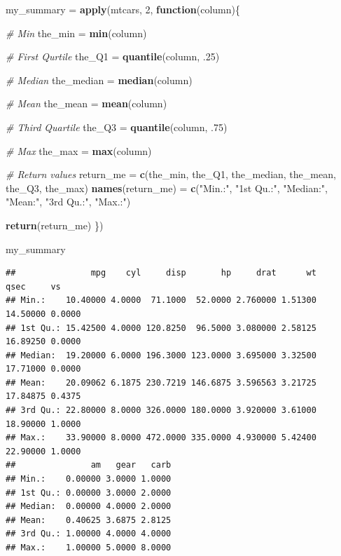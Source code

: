 \documentclass[
]{book}
\newenvironment{Shaded}{\begin{snugshade}}{\end{snugshade}}
\newcommand{\CommentTok}[1]{\textcolor[rgb]{0.56,0.35,0.01}{\textit{#1}}}
\newcommand{\ControlFlowTok}[1]{\textcolor[rgb]{0.13,0.29,0.53}{\textbf{#1}}}
\newcommand{\DecValTok}[1]{\textcolor[rgb]{0.00,0.00,0.81}{#1}}
\newcommand{\FloatTok}[1]{\textcolor[rgb]{0.00,0.00,0.81}{#1}}
\newcommand{\KeywordTok}[1]{\textcolor[rgb]{0.13,0.29,0.53}{\textbf{#1}}}
\newcommand{\NormalTok}[1]{#1}
\newcommand{\StringTok}[1]{\textcolor[rgb]{0.31,0.60,0.02}{#1}}
\begin{document}
\begin{Shaded}
\begin{Highlighting}[]
\NormalTok{my_summary =}\StringTok{ }\KeywordTok{apply}\NormalTok{(mtcars, }\DecValTok{2}\NormalTok{, }\ControlFlowTok{function}\NormalTok{(column)\{}
  
  \CommentTok{# Min}
\NormalTok{  the_min =}\StringTok{ }\KeywordTok{min}\NormalTok{(column)}
  
  \CommentTok{# First Qurtile}
\NormalTok{  the_Q1 =}\StringTok{ }\KeywordTok{quantile}\NormalTok{(column, }\FloatTok{.25}\NormalTok{)}
  
  \CommentTok{# Median}
\NormalTok{  the_median =}\StringTok{ }\KeywordTok{median}\NormalTok{(column)}
  
  \CommentTok{# Mean }
\NormalTok{  the_mean =}\StringTok{ }\KeywordTok{mean}\NormalTok{(column)}
  
  \CommentTok{# Third Quartile}
\NormalTok{  the_Q3 =}\StringTok{ }\KeywordTok{quantile}\NormalTok{(column, }\FloatTok{.75}\NormalTok{)}
  
  \CommentTok{# Max}
\NormalTok{  the_max =}\StringTok{ }\KeywordTok{max}\NormalTok{(column)}
  
  \CommentTok{# Return values}
\NormalTok{  return_me =}\StringTok{ }\KeywordTok{c}\NormalTok{(the_min, the_Q1, the_median,}
\NormalTok{                the_mean, the_Q3, the_max)}
  \KeywordTok{names}\NormalTok{(return_me) =}\StringTok{ }\KeywordTok{c}\NormalTok{(}\StringTok{"Min.:"}\NormalTok{, }\StringTok{"1st Qu.:"}\NormalTok{, }
                       \StringTok{"Median:"}\NormalTok{, }\StringTok{"Mean:"}\NormalTok{, }
                       \StringTok{"3rd Qu.:"}\NormalTok{, }\StringTok{"Max.:"}\NormalTok{)}
  
  \KeywordTok{return}\NormalTok{(return_me)}
\NormalTok{\})}

\NormalTok{my_summary}
\end{Highlighting}
\end{Shaded}

\begin{verbatim}
##               mpg    cyl     disp       hp     drat      wt     qsec     vs
## Min.:    10.40000 4.0000  71.1000  52.0000 2.760000 1.51300 14.50000 0.0000
## 1st Qu.: 15.42500 4.0000 120.8250  96.5000 3.080000 2.58125 16.89250 0.0000
## Median:  19.20000 6.0000 196.3000 123.0000 3.695000 3.32500 17.71000 0.0000
## Mean:    20.09062 6.1875 230.7219 146.6875 3.596563 3.21725 17.84875 0.4375
## 3rd Qu.: 22.80000 8.0000 326.0000 180.0000 3.920000 3.61000 18.90000 1.0000
## Max.:    33.90000 8.0000 472.0000 335.0000 4.930000 5.42400 22.90000 1.0000
##               am   gear   carb
## Min.:    0.00000 3.0000 1.0000
## 1st Qu.: 0.00000 3.0000 2.0000
## Median:  0.00000 4.0000 2.0000
## Mean:    0.40625 3.6875 2.8125
## 3rd Qu.: 1.00000 4.0000 4.0000
## Max.:    1.00000 5.0000 8.0000
\end{verbatim}

  
\end{document}
